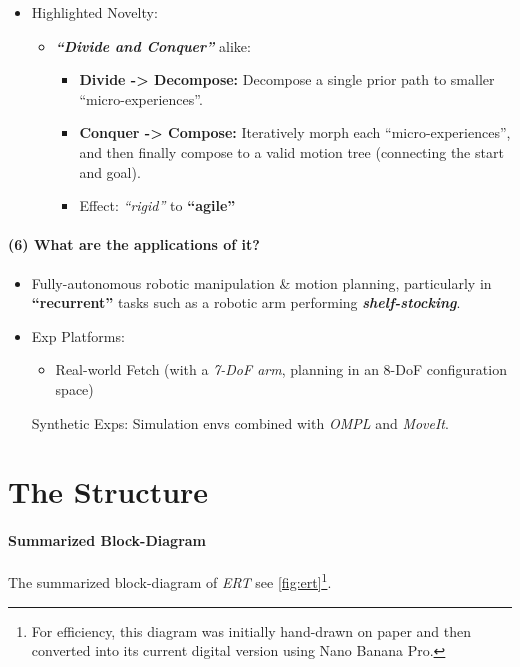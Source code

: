 \documentclass{article}
\begin{document}
\begin{itemize}
\begin{itemize}
\begin{itemize}
    \end{itemize}
  \end{itemize}
  \item Highlighted Novelty:
  \begin{itemize}
    \item \textbf{\textit{``Divide and Conquer''}} alike:
    \begin{itemize}
      \item \textbf{Divide -> Decompose:} Decompose a single prior path to smaller ``micro-experiences''.
      \item \textbf{Conquer -> Compose:} Iteratively morph each ``micro-experiences'', and then finally compose to a valid motion tree (connecting the start and goal).
      \item Effect: \textit{``rigid''} to \textbf{``agile''}
    \end{itemize}
  \end{itemize}
\end{itemize}

\paragraph{(6) What are the applications of it?} 
\begin{itemize}
  \item Fully-autonomous robotic manipulation \& motion planning, particularly in \textbf{``recurrent''} tasks such as a robotic arm performing \textbf{\textit{shelf-stocking}}.
  \item Exp Platforms:
  \begin{itemize}
    \item Real-world Fetch (with a \textit{7-DoF arm}, planning in an 8-DoF configuration space)
  \end{itemize} Synthetic Exps: Simulation envs combined with \textit{OMPL} and \textit{MoveIt}.
\end{itemize}

\section{The Structure}

\paragraph{Summarized Block-Diagram} 

The summarized block-diagram of \textit{ERT} see \cref{fig:ert}\footnote{For efficiency, this diagram was initially hand-drawn on paper and then converted into its current digital version using Nano Banana Pro.}.
\end{document}
